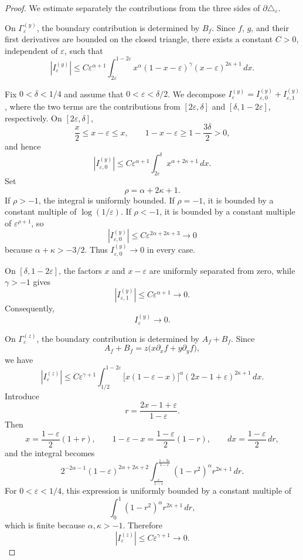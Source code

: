\documentclass[reqno,10pt]{amsart}
\theoremstyle{plain}
\numberwithin{equation}{section}
\numberwithin{figure}{section}
\begin{document}
\begin{proof}
We estimate separately the contributions from the three sides of
\(\partial\triangle_\varepsilon\).

On \(\Gamma_\varepsilon^{(y)}\), the boundary contribution is
determined by \(B_f\). Since \(f\), \(g\), and their first derivatives
are bounded on the closed triangle, there exists a constant \(C>0\),
independent of \(\varepsilon\), such that
\[
\left|I_\varepsilon^{(y)}\right|
\leq
C\varepsilon^{\alpha+1}
\int_{2\varepsilon}^{1-2\varepsilon}
x^\alpha
(1-x-\varepsilon)^\gamma
(x-\varepsilon)^{2\kappa+1}\,dx.
\]

Fix \(0<\delta<1/4\) and assume that
\(0<\varepsilon<\delta/2\). We decompose
\(I_\varepsilon^{(y)}
=I_{\varepsilon,0}^{(y)}+I_{\varepsilon,1}^{(y)}\), where the two terms
are the contributions from \([2\varepsilon,\delta]\) and
\([\delta,1-2\varepsilon]\), respectively. On \([2\varepsilon,\delta]\),
\[
\frac{x}{2}\leq x-\varepsilon\leq x,
\qquad
1-x-\varepsilon
\geq
1-\frac{3\delta}{2}>0,
\]
and hence
\[
\left|I_{\varepsilon,0}^{(y)}\right|
\leq
C\varepsilon^{\alpha+1}
\int_{2\varepsilon}^{\delta}
x^{\alpha+2\kappa+1}\,dx.
\]
Set
\[
\rho=\alpha+2\kappa+1.
\]
If \(\rho>-1\), the integral is uniformly bounded. If \(\rho=-1\),
it is bounded by a constant multiple of
\(\log(1/\varepsilon)\). If \(\rho<-1\), it is bounded by a constant
multiple of \(\varepsilon^{\rho+1}\), so
\[
\left|I_{\varepsilon,0}^{(y)}\right|
\leq
C\varepsilon^{2\alpha+2\kappa+3}
\longrightarrow0
\]
because \(\alpha+\kappa>-3/2\). Thus
\(I_{\varepsilon,0}^{(y)}\to0\) in every case.

On \([\delta,1-2\varepsilon]\), the factors \(x\) and
\(x-\varepsilon\) are uniformly separated from zero, while
\(\gamma>-1\) gives
\[
\left|I_{\varepsilon,1}^{(y)}\right|
\leq
C\varepsilon^{\alpha+1}
\longrightarrow0.
\]
Consequently,
\[
I_\varepsilon^{(y)}\longrightarrow0.
\]

On \(\Gamma_\varepsilon^{(z)}\), the boundary contribution is
determined by \(A_f+B_f\). Since
\[
A_f+B_f
=
z\bigl(x\partial_xf+y\partial_yf\bigr),
\]
we have
\[
\left|I_\varepsilon^{(z)}\right|
\leq
C\varepsilon^{\gamma+1}
\int_{1/2}^{1-2\varepsilon}
\bigl[x(1-\varepsilon-x)\bigr]^\alpha
(2x-1+\varepsilon)^{2\kappa+1}\,dx.
\]
Introduce
\[
r
=
\frac{2x-1+\varepsilon}{1-\varepsilon}.
\]
Then
\[
x=\frac{1-\varepsilon}{2}(1+r),
\qquad
1-\varepsilon-x=\frac{1-\varepsilon}{2}(1-r),
\qquad
dx=\frac{1-\varepsilon}{2}\,dr,
\]
and the integral becomes
\[
2^{-2\alpha-1}
(1-\varepsilon)^{2\alpha+2\kappa+2}
\int_{\frac{\varepsilon}{1-\varepsilon}}^{
      \frac{1-3\varepsilon}{1-\varepsilon}}
(1-r^2)^\alpha r^{2\kappa+1}\,dr.
\]
For \(0<\varepsilon<1/4\), this expression is uniformly bounded by
a constant multiple of
\[
\int_0^1
(1-r^2)^\alpha r^{2\kappa+1}\,dr,
\]
which is finite because \(\alpha,\kappa>-1\). Therefore
\[
\left|I_\varepsilon^{(z)}\right|
\leq
C\varepsilon^{\gamma+1}
\longrightarrow0.
\]


\end{proof}
\end{document}
